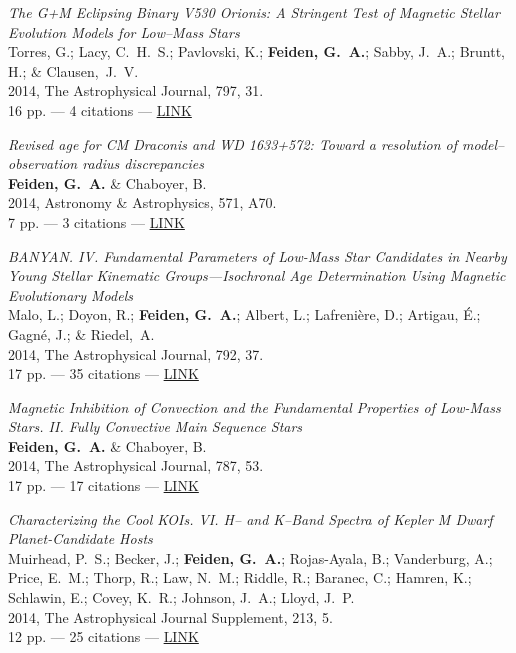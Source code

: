 \documentclass[12pt,letter]{article}
\begin{document}
\begin{etaremune}[leftmargin=0.30in]
	\item {\it The G+M Eclipsing Binary V530 Orionis: A Stringent Test of Magnetic Stellar Evolution Models for Low--Mass Stars} \\
		Torres, G.; Lacy, C.~H.~S.; Pavlovski, K.; {\bf Feiden, G.~A.}; Sabby, J.~A.; Bruntt, H.; \& Clausen,~J.~V.	\\
 		2014, The Astrophysical Journal, 797, 31. \\
		16 pp. --- 4 citations --- \href{http://adsabs.harvard.edu/abs/2014ApJ...797...31T}{LINK}

	\item {\it Revised age for CM Draconis and WD 1633+572: Toward a resolution of model--observation radius discrepancies} \\
        {\bf Feiden, G.~A.} \& Chaboyer, B. \\
        2014, Astronomy \& Astrophysics, 571, A70. \\
        7 pp. --- 3 citations --- \href{http://adsabs.harvard.edu/abs/2014arXiv1405.7051F}{LINK}
    
	\item {\it BANYAN. IV. Fundamental Parameters of Low-Mass Star Candidates in Nearby Young Stellar Kinematic Groups---Isochronal Age Determination Using Magnetic Evolutionary Models} \\
      Malo, L.; Doyon, R.; {\bf Feiden, G.~A.}; Albert, L.; Lafreni\`{e}re, D.; Artigau, \'{E}.; Gagn\'{e}, J.; \& Riedel,~A. \\
      2014, The Astrophysical Journal, 792, 37. \\
      17 pp. --- 35 citations --- \href{http://adsabs.harvard.edu/abs/2014ApJ...792...37M}{LINK}
         
    \item  {\it Magnetic Inhibition of Convection and the Fundamental Properties of Low-Mass Stars. II. Fully Convective Main Sequence Stars} \\
       {\bf Feiden, G.~A.} \& Chaboyer, B. \\
       2014, The Astrophysical Journal, 787, 53. \\
       17 pp. --- 17 citations --- \href{http://adsabs.harvard.edu/abs/2014ApJ...789...53F}{LINK}
    
    \item {\it Characterizing the Cool KOIs. VI. H-- and K--Band Spectra of Kepler M Dwarf Planet-Candidate Hosts} \\
       Muirhead, P.~S.; Becker, J.; {\bf Feiden, G.~A.}; Rojas-Ayala, B.; Vanderburg, A.; Price, E.~M.; Thorp, R.; Law, N.~M.; Riddle, R.; Baranec, C.; Hamren, K.; Schlawin, E.; Covey, K.~R.; Johnson, J.~A.; Lloyd, J.~P. \\
       2014, The Astrophysical Journal Supplement, 213, 5. \\ 
       12 pp. --- 25 citations --- \href{http://adsabs.harvard.edu/abs/2014ApJS..213....5M}{LINK}


\end{etaremune}
\end{document}
